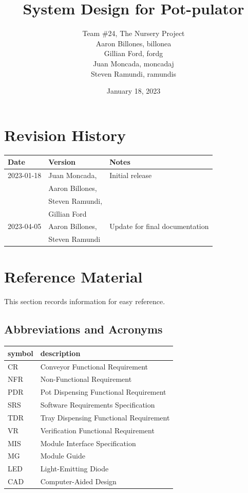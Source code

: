 \documentclass[12pt, titlepage]{article}
\begin{document}
\title{System Design for Pot-pulator} 
\author{Team \#24, The Nursery Project\\Aaron Billones, billonea\\Gillian Ford, fordg\\Juan Moncada, moncadaj\\Steven Ramundi, ramundis}
\date{January 18, 2023}

\maketitle


\section{Revision History}

\begin{tabularx}{\textwidth}{p{3cm}p{4cm}X}
  \toprule {\bf Date} & {\bf Version} & {\bf Notes}\\
  \midrule
  2023-01-18 & Juan Moncada,& Initial release\\&Aaron Billones,\\&Steven Ramundi,\\&Gillian Ford \\
  2023-04-05 & Aaron Billones, &Update for final documentation\\ &Steven Ramundi\\
  \bottomrule
  \end{tabularx}

\newpage

\section{Reference Material}

This section records information for easy reference.

\subsection{Abbreviations and Acronyms}

\renewcommand{\arraystretch}{1.2}
\begin{tabular}{l l} 
  \toprule		
  \textbf{symbol} & \textbf{description}\\
  \midrule 
  CR & Conveyor Functional Requirement\\
  NFR & Non-Functional Requirement\\
  PDR & Pot Dispensing Functional Requirement\\
  SRS & Software Requirements Specification\\
  TDR & Tray Dispensing Functional Requirement\\
  VR & Verification Functional Requirement\\
  MIS & Module Interface Specification \\
  MG & Module Guide \\
  LED & Light-Emitting Diode\\
  CAD & Computer-Aided Design\\
  \bottomrule
\end{tabular}\\
\end{document}
